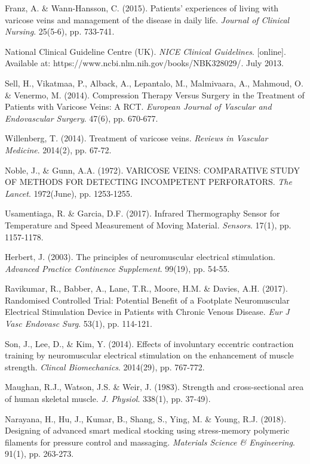 \documentclass[11.5pt]{article}
\begin{document}
\begin{thebibliography}{9}
Franz, A. \& Wann-Hansson, C. (2015). Patients’ experiences of living with varicose veins and management of the disease in daily life. \emph{Journal of Clinical Nursing}. 25(5-6), pp. 733-741.

National Clinical Guideline Centre (UK). \textit{NICE Clinical Guidelines}. [online]. Available at: https://www.ncbi.nlm.nih.gov/books/NBK328029/. July 2013. 

Sell, H., Vikatmaa, P., Alback, A., Lepantalo, M., Malmivaara, A., Mahmoud, O. \& Venermo, M. (2014). Compression Therapy Versus Surgery in the Treatment of Patients with Varicose Veins: A RCT. \emph{European Journal of Vascular and Endovascular Surgery}. 47(6), pp. 670-677.

Willenberg, T. (2014). Treatment of varicose veins. \emph{Reviews in Vascular Medicine}. 2014(2), pp. 67-72.

Noble, J., \& Gunn, A.A. (1972). VARICOSE VEINS: COMPARATIVE STUDY OF METHODS FOR DETECTING INCOMPETENT PERFORATORS. \emph{The Lancet}. 1972(June), pp. 1253-1255.

Usamentiaga, R. \& Garcia, D.F. (2017). Infrared Thermography Sensor for Temperature and Speed Measurement of Moving Material. \emph{Sensors}. 17(1), pp. 1157-1178.

Herbert, J. (2003). The principles of neuromuscular electrical stimulation. \emph{Advanced Practice Continence Supplement}. 99(19), pp. 54-55.

Ravikumar, R., Babber, A., Lane, T.R., Moore, H.M. \& Davies, A.H. (2017). Randomised Controlled Trial: Potential Benefit of a Footplate Neuromuscular Electrical Stimulation Device in Patients with Chronic Venous Disease. \emph{Eur J Vasc Endovasc Surg}. 53(1), pp. 114-121.

Son, J., Lee, D., \& Kim, Y. (2014). Effects of involuntary eccentric contraction training by neuromuscular electrical stimulation on the enhancement of muscle strength. \emph{Clincal Biomechanics}. 2014(29), pp. 767-772.

Maughan, R.J., Watson, J.S. \& Weir, J. (1983). Strength and cross-sectional area of human skeletal muscle. \emph{J. Physiol}. 338(1), pp. 37-49). 

Narayana, H., Hu, J., Kumar, B., Shang, S., Ying, M. \& Young, R.J. (2018). Designing of advanced smart medical stocking using stress-memory polymeric ﬁlaments for pressure control and massaging. \emph{Materials Science \& Engineering}. 91(1), pp. 263-273.


\end{thebibliography}
\end{document}
